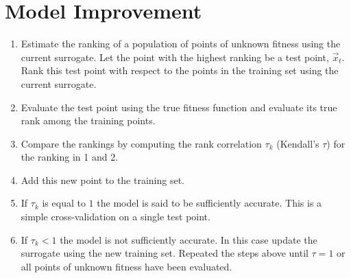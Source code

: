 
\section{Model Improvement}

\begin{enumerate}
\item Estimate the ranking of a population of points of unknown
  fitness using the current surrogate. Let the point with the
  highest ranking be a test point, $\vec{x}_t$. Rank this test
  point with respect to the points in the training set using the
  current surrogate.
\item Evaluate the test point using the true fitness function
  and evaluate its true rank among the training points.
\item Compare the rankings by computing the rank
  correlation $\tau_k$ (Kendall's $\tau$) for the ranking in 1 and 2.
\item Add this new point to the training set.
\item If $\tau_k$ is equal to $1$ the model is said to be
  sufficiently accurate. This is a simple cross-validation
on a single test point.
\item If $\tau_k < 1$ the model is not sufficiently accurate. In
  this case update the surrogate using the new training set.
  Repeated the steps above until $\tau=1$ or all points of
  unknown fitness have been evaluated.
\end{enumerate}
